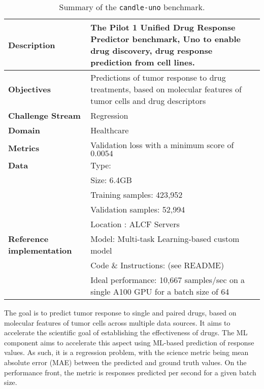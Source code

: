 \begin{small}
\begin{table}
    \caption{Summary of the {\tt candle-uno} benchmark.}\label{tab:uno-summary}
    \begin{center}
    \begin{tabular}{p{}p{}}
    \hline
    \hline
    {\bf Description} &
    The Pilot 1 Unified Drug Response Predictor benchmark, Uno to
    enable drug discovery, drug response prediction from 
    cell lines.\\
    \hline
    {\bf Objectives}
    & Predictions of tumor response to drug treatments, based on molecular features of tumor cells and drug descriptors \\
    \hline
    {\bf Challenge Stream} & Regression\\
    \hline
    {\bf Domain} & Healthcare \\
    \hline
    {\bf Metrics} & Validation loss with a minimum score of $0.0054$ \\
    \hline
    {\bf Data} & Type: \\
            & Size: 6.4GB \\
            & Training samples: 423,952 \\
            & Validation samples: 52,994 \\
            & Location : ALCF Servers~\cite{candle-uno-data} \\
    \hline
    {\bf Reference implementation}  & Model:  Multi-task Learning-based custom model \\
    & Code \& Instructions:  \cite{candle-uno-code-github} (see README)\\
    & Ideal performance: 10,667 samples/sec on a single A100 GPU for a batch size of 64 \\
    \hline
    \end{tabular}
    \end{center}
    \end{table}
\end{small}

 The goal is to predict tumor response to single and paired drugs, based on molecular features of tumor cells across multiple data sources. It aims to accelerate the scientific goal of establishing the effectiveness of drugs. The ML component aims to accelerate this aspect using ML-based prediction of response values. As such, it is a regression problem, with the science metric being mean absolute error (MAE) between the predicted and ground truth values. On the performance front, the metric is responses predicted per second for a given batch size. 

